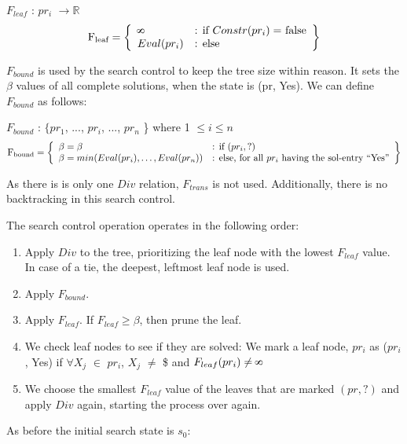 \documentclass[11pt, oneside]{article}   	%
\def\infinity{\rotatebox{90}{8}}
\begin{document}
\noindent $F_{leaf}$ : $pr_i$ $ \to \mathbb{R} $
 \[
          \text{F\textsubscript{leaf}} = \left\{\begin{array}{ll}
            \infinity & \text{: if $Constr(pr_i)=$ false}\\
            Eval(pr_i) & \text{: else}
            \end{array}\right\}
      \]

\noindent $F_{bound}$ is used by the search control to keep the tree size within reason. It sets the $\beta$ values of all complete solutions, when the state is (pr, Yes). 
We can define $F_{bound}$ as follows:

\noindent $F_{bound}$ : $\{pr_1$, ..., $pr_i$, ..., $pr_n$ \} where 1 $\leq i\leq n$
 \[
          \text{F\textsubscript{bound}} = \left\{\begin{array}{ll}
          \beta = \beta & \text{: if $(pr_i, ?)$}\\
          \beta = min(Eval(pr_i), \dots, Eval(pr_n)) & \text{: else, for all $pr_i$ having the sol-entry ``Yes''}\\  
          \end{array}\right\}
      \]
      
\noindent As there is is only one $Div$ relation, $F_{trans}$ is not used. Additionally, there is no backtracking in this search control.

\noindent The search control operation operates in the following order:
\begin{enumerate}
\item Apply $Div$ to the tree, prioritizing the leaf node with the lowest $F_{leaf}$ value. In case of a tie, the deepest, leftmost leaf node is used. 
\item Apply $F_{bound}$.  
\item Apply $F_{leaf}$. If $F_{leaf} \geq \beta $, then prune the leaf.
\item We check leaf nodes to see if they are solved: We mark a leaf node, $pr_i$ as ($pr_i$, Yes) if $\forall$$X_j$ $\in$ $pr_i$, $X_j$ $\neq$ \$ and $F_{leaf}(pr_i) \neq \infinity$
\item We choose the smallest $F_{leaf}$ value of the leaves that are marked $(pr, ?)$  and apply $Div$ again, starting the process over again.
\end{enumerate}


\noindent As before the initial search state is $s_0$:\\
\end{document}
